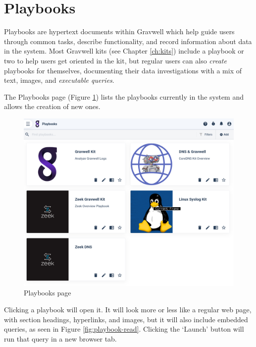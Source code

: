 \clearpage
\section{Playbooks}
Playbooks are hypertext documents within Gravwell which help guide users through common tasks, describe functionality, and record information about data in the system. Most Gravwell kits (see Chapter \ref{ch:kits}) include a playbook or two to help users get oriented in the kit, but regular users can also \emph{create} playbooks for themselves, documenting their data investigations with a mix of text, images, and \emph{executable queries}.

The Playbooks page (Figure \ref{fig:playbooks}) lists the playbooks currently in the system and allows the creation of new ones.

\begin{figure}
	\includegraphics[width=0.8\linewidth]{images/playbooks.png}
	\caption{Playbooks page}
	\label{fig:playbooks}
\end{figure}

Clicking a playbook will open it. It will look more or less like a regular web page, with section headings, hyperlinks, and images, but it will also include embedded queries, as seen in Figure \ref{fig:playbook-read}. Clicking the `Launch' button will run that query in a new browser tab.

